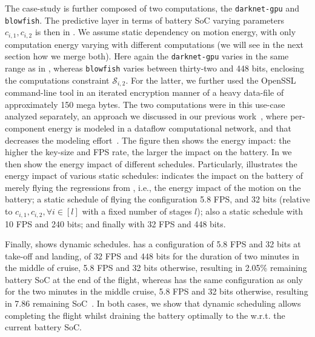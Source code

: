 The case-study is further composed of two computations, the {\small\tt darknet-gpu} and {\small\tt blowfish}. The predictive layer in terms of battery SoC varying parameters $c_{i,1},c_{i,2}$ is then in . We assume static dependency on motion energy, with only computation energy varying with different computations (we will see in the next section how we merge both). Here again the {\small\tt darknet-gpu} varies in the same range as in , whereas {\small\tt blowfish} varies between thirty-two and 448 bits, enclosing the computations constraint $\mathcal{S}_{i,2}$. For the latter, we further used the OpenSSL~\citep{viega2002network} command-line tool in an iterated encryption manner of a heavy data-file of approximately 150 mega bytes. The two computations were in this use-case analyzed separately, an approach we discussed in our previous work~\citep{seewald2019coarse}, where per-component energy is modeled in a dataflow computational network, and that decreases the modeling effort~\citep{seewald2020mechanical}. The figure then shows the energy impact: the higher the key-size and FPS rate, the larger the impact on the battery. In  we then show the energy impact of different schedules. Particularly,  illustrates the energy impact of various static schedules:  indicates the impact on the battery of merely flying the regressions from , i.e., the energy impact of the motion on the battery;  a static schedule of flying the configuration 5.8 FPS, and 32 bits (relative to $c_{i,1},c_{i,2},\forall i\in[l]$ with a fixed number of stages $l$);  also a static schedule with 10 FPS and 240 bits; and finally  with 32 FPS and 448 bits.

Finally,  shows dynamic schedules.  has a configuration of 5.8 FPS and 32 bits at take-off and landing, of 32 FPS and 448 bits for the duration of two minutes in the middle of cruise, 5.8 FPS and 32 bits otherwise, resulting in 2.05\% remaining battery SoC at the end of the flight, whereas  has the same configuration as  only for the two minutes in the middle cruise, 5.8 FPS and 32 bits otherwise, resulting in 7.86 remaining SoC~\citep{seewald2020mechanical}. In both cases, we show that dynamic scheduling allows completing the flight whilst draining the battery optimally to the w.r.t. the current battery SoC.

